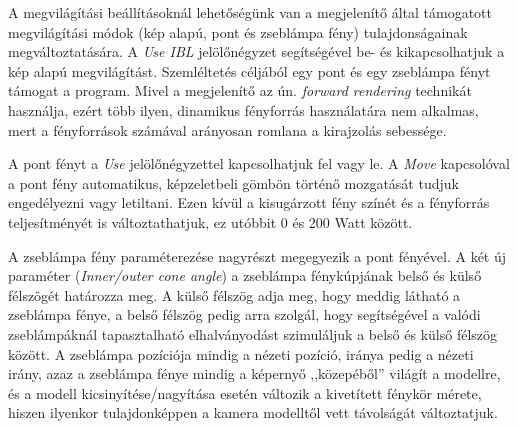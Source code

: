 A megvilágítási beállításoknál lehetőségünk van a megjelenítő által támogatott megvilágítási módok (kép alapú, pont és zseblámpa fény) tulajdonságainak megváltoztatására. A \textit{Use IBL} jelölőnégyzet segítségével be- és kikapcsolhatjuk a kép alapú megvilágítást. Szemléltetés céljából egy pont és egy zseblámpa fényt támogat a program. Mivel a megjelenítő az ún. \textit{forward rendering} technikát használja, ezért több ilyen, dinamikus fényforrás használatára nem alkalmas, mert a fényforrások számával arányosan romlana a kirajzolás sebessége.

A pont fényt a \textit{Use} jelölőnégyzettel kapcsolhatjuk fel vagy le. A \textit{Move} kapcsolóval a pont fény automatikus, képzeletbeli gömbön történő mozgatását tudjuk engedélyezni vagy letiltani. Ezen kívül a kisugárzott fény színét és a fényforrás teljesítményét is változtathatjuk, ez utóbbit 0 és 200 Watt között.

A zseblámpa fény paraméterezése nagyrészt megegyezik a pont fényével. A két új paraméter (\textit{Inner/outer cone angle}) a zseblámpa fénykúpjának belső és külső félszögét határozza meg. A külső félszög adja meg, hogy meddig látható a zseblámpa fénye, a belső félszög pedig arra szolgál, hogy segítségével a valódi zseblámpáknál tapasztalható elhalványodást szimuláljuk a belső és külső félszög között. A zseblámpa pozíciója mindig a nézeti pozíció, iránya pedig a nézeti irány, azaz a zseblámpa fénye mindig a képernyő ,,közepéből'' világít a modellre, és a modell kicsinyítése/nagyítása esetén változik a kivetített fénykör mérete, hiszen ilyenkor tulajdonképpen a kamera modelltől vett távolságát változtatjuk.
